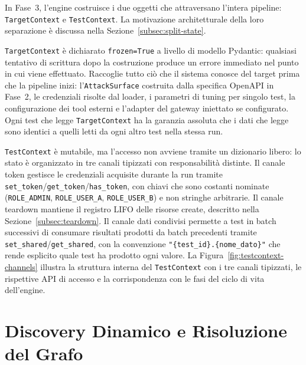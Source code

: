 In Fase~3, l'engine costruisce i due oggetti che attraversano l'intera pipeline: \texttt{TargetContext} e \texttt{TestContext}. La motivazione architetturale della loro separazione è discussa nella Sezione~\ref{subsec:split-state}.

\texttt{TargetContext} è dichiarato \texttt{frozen=True} a livello di modello Pydantic: qualsiasi tentativo di scrittura dopo la costruzione produce un errore immediato nel punto in cui viene effettuato. Raccoglie tutto ciò che il sistema conosce del target prima che la pipeline inizi: l'\texttt{AttackSurface} costruita dalla specifica OpenAPI in Fase~2, le credenziali risolte dal loader, i parametri di tuning per singolo test, la configurazione dei tool esterni e l'adapter del gateway iniettato se configurato. Ogni test che legge \texttt{TargetContext} ha la garanzia assoluta che i dati che legge sono identici a quelli letti da ogni altro test nella stessa run.

\texttt{TestContext} è mutabile, ma l'accesso non avviene tramite un dizionario libero: lo stato è organizzato in tre canali tipizzati con responsabilità distinte. Il canale token gestisce le credenziali acquisite durante la run tramite \texttt{set\_token}/\texttt{get\_token}/\texttt{has\_token}, con chiavi che sono costanti nominate (\texttt{ROLE\_ADMIN}, \texttt{ROLE\_USER\_A}, \texttt{ROLE\_USER\_B}) e non stringhe arbitrarie. Il canale teardown mantiene il registro \gls{LIFO} delle risorse create, descritto nella Sezione~\ref{subsec:teardown}. Il canale dati condivisi permette a test in batch successivi di consumare risultati prodotti da batch precedenti tramite \texttt{set\_shared}/\texttt{get\_shared}, con la convenzione \texttt{"\{test\_id\}.\{nome\_dato\}"} che rende esplicito quale test ha prodotto ogni valore. La Figura~\ref{fig:testcontext-channels} illustra la struttura interna del \texttt{TestContext} con i tre canali tipizzati, le rispettive \gls{API} di accesso e la corrispondenza con le fasi del ciclo di vita dell'engine.




\section{Discovery Dinamico e Risoluzione del Grafo}%
\label{sec:discovery-dag}

